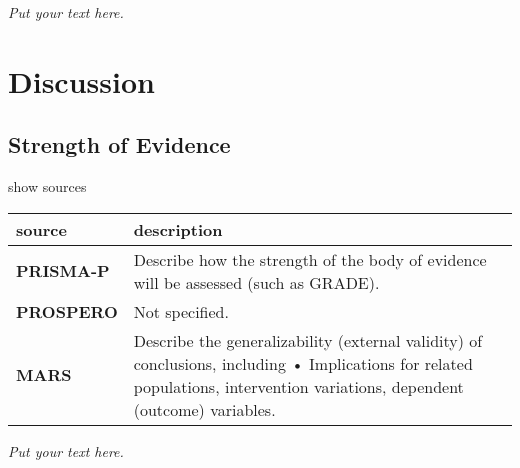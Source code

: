 \documentclass[]{article}
\begin{document}
\emph{Put your text here.}

\hypertarget{discussion}{%
\section{Discussion}\label{discussion}}

\hypertarget{strength-of-evidence}{%
\subsection{Strength of Evidence}\label{strength-of-evidence}}

show sources

\hypertarget{stroe}{}
\begin{table}[H]
\centering
\begin{tabular}{>{\bfseries}l|l}
\hline
\rowcolor[HTML]{ececec}  source & description\\
\hline
PRISMA-P & Describe how the strength of the body of evidence will be assessed (such as GRADE).\\
\hline
PROSPERO & Not specified.\\
\hline
MARS & Describe the generalizability (external validity) of conclusions, including • Implications for related populations, intervention variations, dependent (outcome) variables.\\
\hline
\end{tabular}
\end{table}

\emph{Put your text here.}
\end{document}
